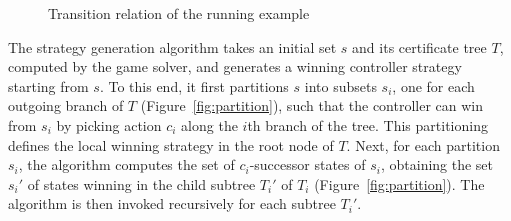 \begin{figure}
    \centering
    \caption{Transition relation of the running example}
    \label{fig:stratExample}
\end{figure}

The strategy generation algorithm takes an initial set $s$ and its certificate tree $T$, computed by the game solver, and generates a winning controller strategy starting from $s$.  To this end, it first partitions $s$ into subsets $s_i$, one for each outgoing branch of $T$ (Figure~\ref{fig:partition}), such that the controller can win from $s_i$ by picking action $c_i$ along the $i$th branch of the tree.  This partitioning defines the local winning strategy in the root node of $T$.  Next, for each partition $s_i$, the algorithm computes the set of $c_i$-successor states of $s_i$, obtaining the set $s_i'$ of states winning in the child subtree $T_i'$ of $T_i$ (Figure~\ref{fig:partition}).  The algorithm is then invoked recursively for each subtree $T_i'$.

